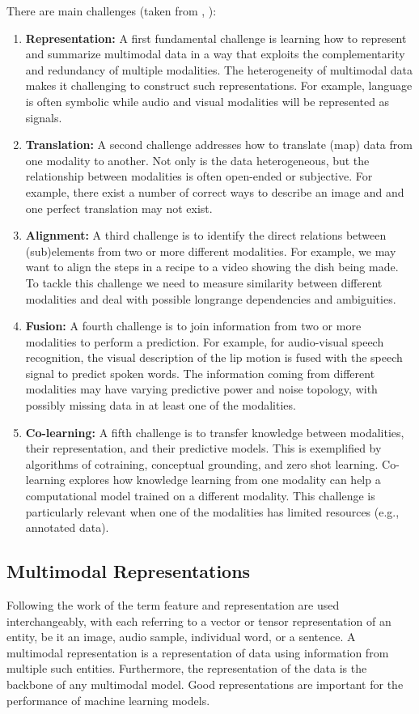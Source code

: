 There are main challenges (taken from \cite{Baltruvsaitis2017multimodal}, ):
\begin{enumerate}
\item \textbf{Representation:} A first fundamental challenge is learning how to represent and summarize multimodal data in a way that exploits the complementarity and redundancy of multiple modalities. The heterogeneity of multimodal data makes it challenging to construct such representations. For example, language is often symbolic while audio and visual modalities will be represented as signals.
\item \textbf{Translation:} A second challenge addresses how to translate (map) data from one modality to another. Not only is the data heterogeneous, but the relationship between modalities is often open-ended or subjective. For example, there exist a number of correct ways to describe an image and and one perfect translation may not exist.
\item \textbf{Alignment:} A third challenge is to identify the direct relations between (sub)elements from two or more different modalities. For example, we may want to align the steps in a recipe to a video showing the dish being made. To tackle this challenge we need to measure similarity between different modalities and deal with possible longrange dependencies and ambiguities.
\item \textbf{Fusion:} A fourth challenge is to join information from two or more modalities to perform a prediction. For example, for audio-visual speech recognition, the visual description of the lip motion is fused with the speech signal to predict spoken words. The information coming
from different modalities may have varying predictive power and noise topology, with possibly missing data in at least one of the modalities.
\item \textbf{Co-learning:} A fifth challenge is to transfer knowledge between modalities, their representation, and their predictive models. This is exemplified by algorithms of cotraining,
conceptual grounding, and zero shot learning.
Co-learning explores how knowledge learning from one modality can help a computational model trained on a different modality. This challenge is particularly relevant when one of the modalities has limited resources (e.g., annotated data).
\end{enumerate}

\subsection{Multimodal Representations}
\label{sec:multiRepr}
Following the work of \cite{Bengio2013representation} the term feature and representation are used interchangeably, with each referring to a vector or tensor representation of an entity, be it an image, audio sample, individual word, or a sentence. A multimodal representation is a representation of data using information from multiple such entities. Furthermore, the representation of the data is the backbone of any multimodal model. Good representations are important for the performance of machine learning models.

